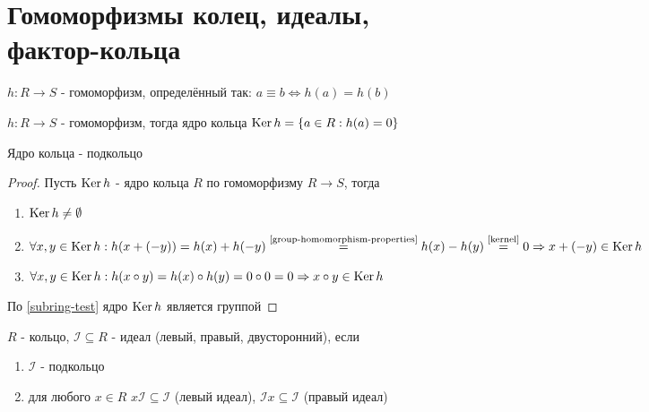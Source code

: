 \documentclass[../main/document.tex]{subfiles}
\begin{document}
\section{Гомоморфизмы колец, идеалы,\\ фактор-кольца}
\begin{dfn}
$h:R\to S$ - гомоморфизм, определённый так: $a\equiv b\Leftrightarrow h(a)=h(b)$
\end{dfn}
\begin{dfn}\label{kernel}
$h:R\to S$ - гомоморфизм, тогда ядро кольца $\operatorname{Ker} h=\{a\in R:h(a)=0\}$ 
\end{dfn}
\begin{thm}\label{kernel-subring}
Ядро кольца - подкольцо
\begin{proof}
Пусть $\operatorname{Ker} h$ - ядро кольца $R$ по гомоморфизму $R\to S$, тогда
\begin{enumerate}
\item $\operatorname{Ker} h\neq \emptyset$
\item $\forall x,y\in \operatorname{Ker} h:h(x+(-y))=h(x)+h(-y)\stackrel{\text{\ref{group-homomorphism-properties}}}{=}
h(x)-h(y)\stackrel{\text{\ref{kernel}}}{=}0\Rightarrow x+(-y)\in \operatorname{Ker} h$
\item $\forall x,y\in \operatorname{Ker} h:h(x\circ y)=h(x)\circ h(y)=0\circ 0=0\Rightarrow  x\circ y\in \operatorname{Ker} h$
\end{enumerate}
По \ref{subring-test} ядро $\operatorname{Ker} h$ является группой
\end{proof}
\end{thm}

\begin{dfn}[Идеал]\label{ideal}
$R$ - кольцо, $\mathcal{I}\subseteq R$ - идеал (левый, правый, двусторонний), если
\begin{enumerate}
\item $\mathcal{I}$ - подкольцо
\item для любого $x\in R$ $x\mathcal{I}\subseteq\mathcal{I}$ (левый идеал), $\mathcal{I} x\subseteq\mathcal{I}$ (правый идеал)
\end{enumerate}
\end{dfn}
\end{document}
